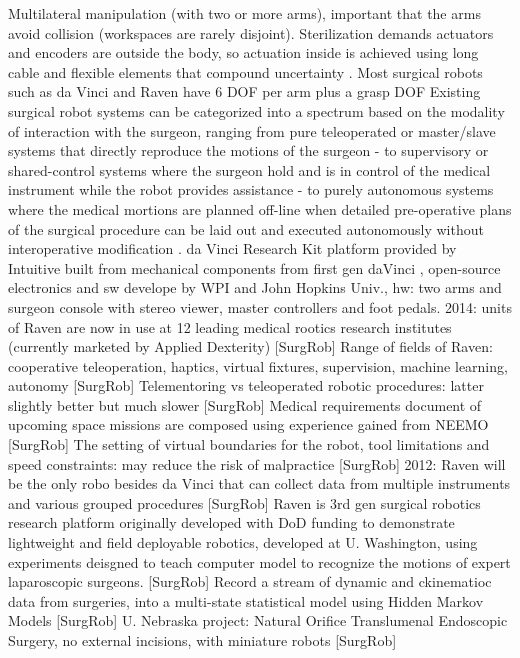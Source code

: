 Multilateral manipulation (with two or more arms), important that the arms avoid collision \citep{bib:raven_debride} (workspaces are rarely disjoint).
Sterilization demands actuators and encoders are outside the body, so actuation inside is achieved using long cable and flexible elements that compound uncertainty \citep{bib:raven_debride}.
Most surgical robots such as da Vinci and Raven have 6 DOF per arm plus a grasp DOF \citep{bib:raven_debride}
Existing surgical robot systems can be categorized into a spectrum based on the modality of interaction with the surgeon, ranging from pure teleoperated or master/slave systems that directly reproduce the motions of the surgeon - to supervisory or shared-control systems where the surgeon hold and is in control of the medical instrument while the robot provides assistance - to purely autonomous systems where the medical mortions are planned off-line when detailed pre-operative plans of the surgical procedure can be laid out and executed autonomously without interoperative modification \citep{bib:raven_debride}.
da Vinci Research Kit platform provided by Intuitive built from mechanical components from first gen daVinci \citep{bib:raven_observ}, open-source electronics and sw develope by WPI and John Hopkins Univ., hw: two arms and surgeon console with stereo viewer, master controllers and foot pedals.
2014: units of Raven are now in use at 12 leading medical rootics research institutes (currently marketed by Applied Dexterity) [SurgRob]
Range of fields of Raven: cooperative teleoperation, haptics, virtual fixtures, supervision, machine learning, autonomy [SurgRob]
Telementoring vs teleoperated robotic procedures: latter slightly better but much slower [SurgRob]
Medical requirements document of upcoming space missions are composed using experience gained from NEEMO [SurgRob]
The setting of virtual boundaries for the robot, tool limitations and speed constraints: may reduce the risk of malpractice [SurgRob]
2012: Raven will be the only robo besides da Vinci that can collect data from multiple instruments and various grouped procedures [SurgRob]
Raven is 3rd gen surgical robotics research platform originally developed with DoD funding to demonstrate lightweight and field deployable robotics, developed at U. Washington, using experiments deisgned to teach  computer model to recognize the motions of expert laparoscopic surgeons. [SurgRob] Record a stream of dynamic and ckinematioc data from surgeries, into a multi-state statistical model using Hidden Markov Models [SurgRob]
U. Nebraska project: Natural Orifice Translumenal Endoscopic Surgery, no external incisions, with miniature robots [SurgRob]

